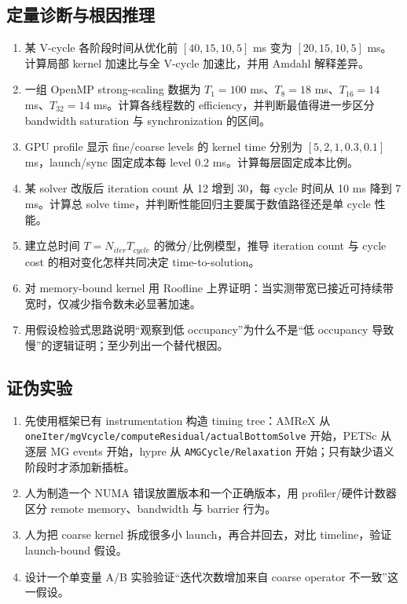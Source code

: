 \subsection*{定量诊断与根因推理}
\begin{enumerate}[label=\arabic*.]
\item 某 V-cycle 各阶段时间从优化前 $[40,15,10,5]$ ms 变为 $[20,15,10,5]$ ms。计算局部 kernel 加速比与全 V-cycle 加速比，并用 Amdahl 解释差异。
\item 一组 OpenMP strong-scaling 数据为 $T_1=100$ ms、$T_8=18$ ms、$T_{16}=14$ ms、$T_{32}=14$ ms。计算各线程数的 efficiency，并判断最值得进一步区分 bandwidth saturation 与 synchronization 的区间。
\item GPU profile 显示 fine/coarse levels 的 kernel time 分别为 $[5,2,1,0.3,0.1]$ ms，launch/sync 固定成本每 level 0.2 ms。计算每层固定成本比例。
\item 某 solver 改版后 iteration count 从 12 增到 30，每 cycle 时间从 10 ms 降到 7 ms。计算总 solve time，并判断性能回归主要属于数值路径还是单 cycle 性能。

\item 建立总时间 $T=N_{iter}T_{cycle}$ 的微分/比例模型，推导 iteration count 与 cycle cost 的相对变化怎样共同决定 time-to-solution。
\item 对 memory-bound kernel 用 Roofline 上界证明：当实测带宽已接近可持续带宽时，仅减少指令数未必显著加速。
\item 用假设检验式思路说明“观察到低 occupancy”为什么不是“低 occupancy 导致慢”的逻辑证明；至少列出一个替代根因。
\end{enumerate}

\subsection*{证伪实验}
\begin{enumerate}[label=\arabic*.]
\item 先使用框架已有 instrumentation 构造 timing tree：AMReX 从 \texttt{oneIter/mgVcycle/computeResidual/actualBottomSolve} 开始，PETSc 从逐层 MG events 开始，hypre 从 \texttt{AMGCycle/Relaxation} 开始；只有缺少语义阶段时才添加新插桩。
\item 人为制造一个 NUMA 错误放置版本和一个正确版本，用 profiler/硬件计数器区分 remote memory、bandwidth 与 barrier 行为。
\item 人为把 coarse kernel 拆成很多小 launch，再合并回去，对比 timeline，验证 launch-bound 假设。
\item 设计一个单变量 A/B 实验验证“迭代次数增加来自 coarse operator 不一致”这一假设。
\end{enumerate}

